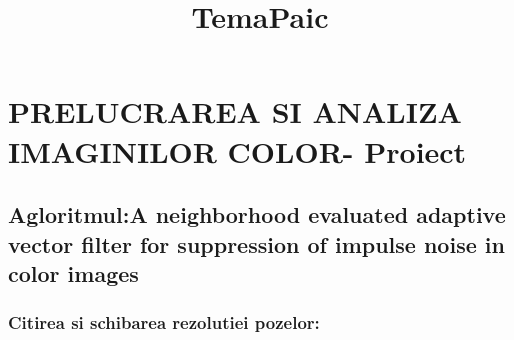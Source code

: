 \documentclass[11pt]{article}
\title{TemaPaic}
\begin{document}
    
    
    \maketitle
    
    

    
    \section{PRELUCRAREA SI ANALIZA IMAGINILOR COLOR-
Proiect}\label{prelucrarea-si-analiza-imaginilor-color--proiect}

\subsection{Agloritmul:A neighborhood evaluated adaptive vector filter
for suppression of impulse noise in color
images}\label{agloritmula-neighborhood-evaluated-adaptive-vector-filter-for-suppression-of-impulse-noise-in-color-images}

\subsubsection{Citirea si schibarea rezolutiei
pozelor:}\label{citirea-si-schibarea-rezolutiei-pozelor}
\end{document}

